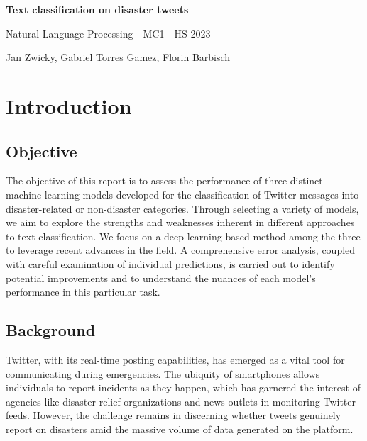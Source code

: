 \documentclass[10pt,table]{article}
\begin{document}
\begin{titlepage}
   \begin{center}
        \vspace{0.5cm}
        \begin{center}
        \end{center}
       \vspace*{1cm}
        \Huge
       \textbf{Text classification on disaster tweets}

       \vspace{0.5cm}
       Natural Language Processing - MC1 - HS 2023
            
       \vspace{1.5cm}

       Jan Zwicky, Gabriel Torres Gamez, Florin Barbisch

       \vfill
      
      \tiny
   \end{center}
\end{titlepage}
\tableofcontents
\newpage %


\section{Introduction}
\subsection{Objective}
The objective of this report is to assess the performance of three distinct machine-learning models developed for the classification of Twitter messages into disaster-related or non-disaster categories. Through selecting a variety of models, we aim to explore the strengths and weaknesses inherent in different approaches to text classification. We focus on a deep learning-based method among the three to leverage recent advances in the field. A comprehensive error analysis, coupled with careful examination of individual predictions, is carried out to identify potential improvements and to understand the nuances of each model's performance in this particular task.

\subsection{Background}
Twitter, with its real-time posting capabilities, has emerged as a vital tool for communicating during emergencies. The ubiquity of smartphones allows individuals to report incidents as they happen, which has garnered the interest of agencies like disaster relief organizations and news outlets in monitoring Twitter feeds. However, the challenge remains in discerning whether tweets genuinely report on disasters amid the massive volume of data generated on the platform.
\end{document}
